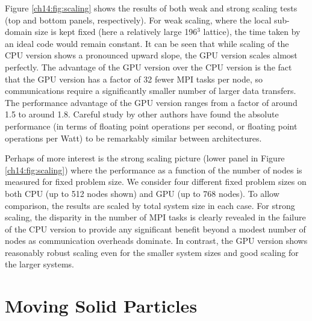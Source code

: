 Figure \ref{ch14:fig:scaling} shows the results of both weak and
strong scaling tests (top and bottom panels, respectively). For
weak scaling, where the local sub-domain size is kept fixed
(here a relatively large 196$^3$ lattice), the time taken by
an ideal code would remain constant. It can be seen that while
scaling of the CPU version shows a pronounced upward slope, the
GPU version scales almost perfectly. The advantage of the GPU
version over the CPU version is the fact that the GPU version
has a factor of 32 fewer MPI tasks per node, so communications
require a significantly smaller number of larger data transfers.
The performance
advantage of the GPU version ranges from a factor of around 1.5 to
around 1.8. Careful study by other authors \cite{williams2011} have
found the absolute performance (in terms of floating point
operations per second, or floating point operations per Watt) to
be remarkably similar between architectures.

Perhaps of more interest is the strong scaling picture (lower
panel in Figure \ref{ch14:fig:scaling}) where the performance
as a function of the number of nodes is measured for fixed problem
size. We consider four different fixed problem sizes on both CPU
(up to 512 nodes shown) and GPU (up to 768 nodes). To allow comparison,
the results are scaled by total system size in each case. For strong
scaling, the disparity in the number of MPI tasks is clearly revealed
in the failure of the CPU version to provide any significant benefit
beyond a modest number of nodes as communication overheads dominate.
In contrast, the GPU version shows
reasonably robust scaling even for the smaller system sizes and good
scaling for the larger systems.

\section{Moving Solid Particles}\label{ch14:sec:particles}

